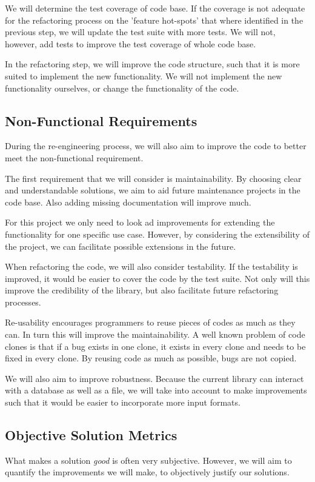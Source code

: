 \documentclass[]{article}
\begin{document}
We will determine the test coverage of code base. If the coverage is not adequate for the refactoring process on the 'feature hot-spots' that where identified in the previous step, we will update the test suite with more tests. We will not, however, add tests to improve the test coverage of whole code base.

In the refactoring step, we will improve the code structure, such that it is more suited to implement the new functionality. We will not implement the new functionality ourselves, or change the functionality of the code. 

\subsection{Non-Functional Requirements}
During the re-engineering process, we will also aim to improve the code to better meet the non-functional requirement. 

The first requirement that we will consider is maintainability. By choosing clear and understandable solutions, we aim to aid future maintenance projects in the code base. Also adding missing documentation will improve much.

For this project we only need to look ad improvements for extending the functionality for one specific use case. However, by considering the extensibility of the project, we can facilitate possible extensions in the future. 

When refactoring the code, we will also consider testability. If the testability is improved, it would be easier to cover the code by the test suite. Not only will this improve the credibility of the library, but also facilitate future refactoring processes. 

Re-usability encourages programmers to reuse pieces of codes as much as they can. In turn this will improve the maintainability. A well known problem of code clones is that if a bug exists in one clone, it exists in every clone and needs to be fixed in every clone. By reusing code as much as possible, bugs are not copied.

We will also aim to improve robustness. Because the current library can interact with a database as well as a file, we will take into account to make improvements such that it would be easier to incorporate more input formats.

\subsection{Objective Solution Metrics}
What makes a solution \textit{good} is often very subjective. However, we will aim to quantify the improvements we will make, to objectively justify our solutions. 
\end{document}
